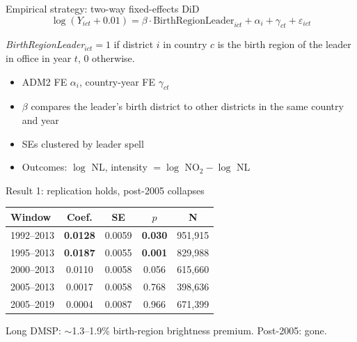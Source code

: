 \documentclass[aspectratio=169, 11pt]{beamer}
\begin{document}
\begin{frame}{Empirical strategy: two-way fixed-effects DiD}
    \begin{equation*}
        \log(Y_{ict} + 0.01) = \beta \cdot \text{BirthRegionLeader}_{ict} + \alpha_i + \gamma_{ct} + \varepsilon_{ict}
    \end{equation*}

    \vspace{0.3em}
    \footnotesize\textit{BirthRegionLeader}$_{ict} = 1$ if district $i$ in country $c$ is the birth region of the leader in office in year $t$, $0$ otherwise.
    \normalsize

    \vspace{0.5em}
    \begin{itemize}
        \item ADM2 FE $\alpha_i$, country-year FE $\gamma_{ct}$
        \item $\beta$ compares the leader's birth district to other districts in the same country and year
        \item SEs clustered by leader spell
        \item Outcomes: $\log$ NL, intensity $= \log$ NO$_2 - \log$ NL
    \end{itemize}
\end{frame}

\begin{frame}{Result 1: replication holds, post-2005 collapses}
    \centering
    \small
    \begin{tabular}{lcccc}
        \toprule
        Window & Coef. & SE & $p$ & N \\
        \midrule
        1992--2013 & \textbf{0.0128} & 0.0059 & \textbf{0.030} & 951{,}915 \\
        1995--2013 & \textbf{0.0187} & 0.0055 & \textbf{0.001} & 829{,}988 \\
        2000--2013 & 0.0110 & 0.0058 & 0.056 & 615{,}660 \\
        \midrule
        \rowcolor{red!10}
        2005--2013 & 0.0017 & 0.0058 & 0.768 & 398{,}636 \\
        \rowcolor{red!10}
        2005--2019 & 0.0004 & 0.0087 & 0.966 & 671{,}399 \\
        \bottomrule
    \end{tabular}

    \vspace{0.8em}
    \small Long DMSP: $\sim$1.3--1.9\% birth-region brightness premium. Post-2005: gone.
\end{frame}
\end{document}
